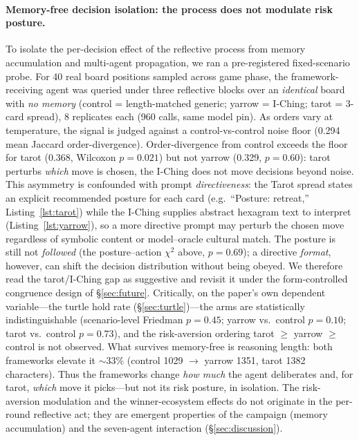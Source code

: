\documentclass[11pt]{article}
\begin{document}
\paragraph{Memory-free decision isolation: the process does not modulate risk posture.}
To isolate the per-decision effect of the reflective process from memory accumulation and multi-agent propagation, we ran a pre-registered fixed-scenario probe. For 40 real board positions sampled across game phase, the framework-receiving agent was queried under three reflective blocks over an \emph{identical} board with \emph{no memory} (control = length-matched generic; yarrow = I-Ching; tarot = 3-card spread), 8 replicates each (960 calls, same model pin). As orders vary at temperature, the signal is judged against a control-vs-control noise floor (0.294 mean Jaccard order-divergence). Order-divergence from control exceeds the floor for tarot (0.368, Wilcoxon $p = 0.021$) but not yarrow (0.329, $p = 0.60$): tarot perturbs \emph{which} move is chosen, the I-Ching does not move decisions beyond noise. This asymmetry is confounded with prompt \emph{directiveness}: the Tarot spread states an explicit recommended posture for each card (e.g.\ ``Posture: retreat,'' Listing~\ref{lst:tarot}) while the I-Ching supplies abstract hexagram text to interpret (Listing~\ref{lst:yarrow}), so a more directive prompt may perturb the chosen move regardless of symbolic content or model--oracle cultural match. The posture is still not \emph{followed} (the posture--action $\chi^2$ above, $p = 0.69$); a directive \emph{format}, however, can shift the decision distribution without being obeyed. We therefore read the tarot/I-Ching gap as suggestive and revisit it under the form-controlled congruence design of \S\ref{sec:future}. Critically, on the paper's own dependent variable---the turtle hold rate (\S\ref{sec:turtle})---the arms are statistically indistinguishable (scenario-level Friedman $p = 0.45$; yarrow vs.\ control $p = 0.10$; tarot vs.\ control $p = 0.73$), and the risk-aversion ordering tarot $\geq$ yarrow $\geq$ control is not observed. What survives memory-free is reasoning length: both frameworks elevate it ${\sim}33\%$ (control 1029 $\to$ yarrow 1351, tarot 1382 characters). Thus the frameworks change \emph{how much} the agent deliberates and, for tarot, \emph{which} move it picks---but not its risk posture, in isolation. The risk-aversion modulation and the winner-ecosystem effects do not originate in the per-round reflective act; they are emergent properties of the campaign (memory accumulation) and the seven-agent interaction (\S\ref{sec:discussion}).
\end{document}
